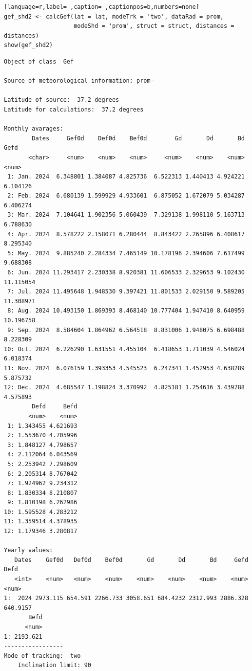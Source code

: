 \begin{lstlisting}[language=r,label= ,caption= ,captionpos=b,numbers=none]
gef_shd2 <- calcGef(lat = lat, modeTrk = 'two', dataRad = prom,
                    modeShd = 'prom', struct = struct, distances = distances)
show(gef_shd2)
\end{lstlisting}

\begin{verbatim}
Object of class  Gef 

Source of meteorological information: prom- 

Latitude of source:  37.2 degrees
Latitude for calculations:  37.2 degrees

Monthly avarages:
        Dates     Gef0d    Def0d    Bef0d        Gd       Dd       Bd      Gefd
       <char>     <num>    <num>    <num>     <num>    <num>    <num>     <num>
 1: Jan. 2024  6.348801 1.384087 4.825736  6.522313 1.440413 4.924221  6.104126
 2: Feb. 2024  6.680139 1.599929 4.933601  6.875052 1.672079 5.034287  6.406274
 3: Mar. 2024  7.104641 1.902356 5.060439  7.329138 1.998110 5.163713  6.788630
 4: Apr. 2024  8.578222 2.158071 6.280444  8.843422 2.265896 6.408617  8.295340
 5: May. 2024  9.885240 2.284334 7.465149 10.178196 2.394606 7.617499  9.688308
 6: Jun. 2024 11.293417 2.230338 8.920381 11.606533 2.329653 9.102430 11.115054
 7: Jul. 2024 11.495648 1.948530 9.397421 11.801533 2.029150 9.589205 11.308971
 8: Aug. 2024 10.493150 1.869393 8.468140 10.777404 1.947410 8.640959 10.196758
 9: Sep. 2024  8.584604 1.864962 6.564518  8.831006 1.948075 6.698488  8.228309
10: Oct. 2024  6.226290 1.631551 4.455104  6.418653 1.711039 4.546024  6.018374
11: Nov. 2024  6.076159 1.393353 4.545523  6.247341 1.452953 4.638289  5.875732
12: Dec. 2024  4.685547 1.198824 3.370992  4.825181 1.254616 3.439788  4.575893
        Defd     Befd
       <num>    <num>
 1: 1.343455 4.621693
 2: 1.553670 4.705996
 3: 1.848127 4.798657
 4: 2.112064 6.043569
 5: 2.253942 7.298609
 6: 2.205314 8.767042
 7: 1.924962 9.234312
 8: 1.830334 8.210807
 9: 1.810198 6.262986
10: 1.595528 4.283212
11: 1.359514 4.378935
12: 1.179346 3.280817

Yearly values:
   Dates    Gef0d   Def0d    Bef0d       Gd       Dd       Bd     Gefd     Defd
   <int>    <num>   <num>    <num>    <num>    <num>    <num>    <num>    <num>
1:  2024 2973.115 654.591 2266.733 3058.651 684.4232 2312.993 2886.328 640.9157
       Befd
      <num>
1: 2193.621
-----------------
Mode of tracking:  two 
    Inclination limit: 90
\end{verbatim}

